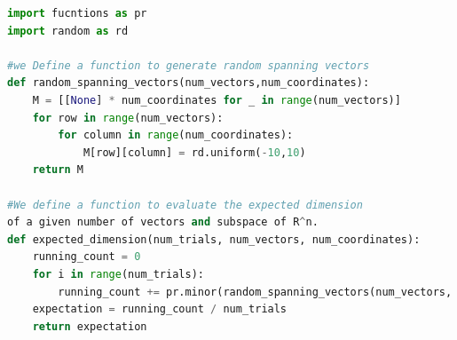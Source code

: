 \documentclass{article}
\begin{document}
\begin{lstlisting}[language=Python, caption=Expected Dimension Of Random Span, label=randomspaces]
import fucntions as pr
import random as rd

#we Define a function to generate random spanning vectors
def random_spanning_vectors(num_vectors,num_coordinates):
    M = [[None] * num_coordinates for _ in range(num_vectors)]
    for row in range(num_vectors):
        for column in range(num_coordinates):
            M[row][column] = rd.uniform(-10,10)
    return M

#We define a function to evaluate the expected dimension 
of a given number of vectors and subspace of R^n.
def expected_dimension(num_trials, num_vectors, num_coordinates):
    running_count = 0
    for i in range(num_trials):
        running_count += pr.minor(random_spanning_vectors(num_vectors, num_coordinates))
    expectation = running_count / num_trials
    return expectation
\end{lstlisting}
\end{document}
